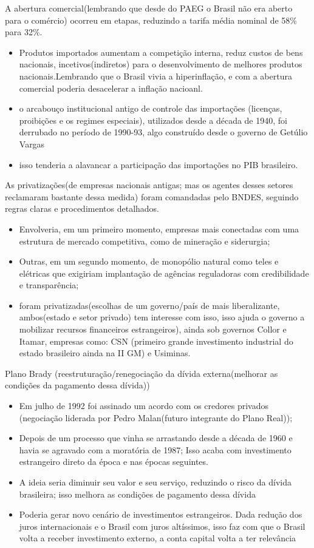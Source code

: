 \documentclass[a4paper,12pt]{article}[abntex2]
\begin{document}
A abertura comercial(lembrando que desde do PAEG o Brasil não era aberto para o comércio) ocorreu em etapas, reduzindo a tarifa média nominal de 58\% para 32\%.\begin{itemize}
    \item Produtos importados aumentam a competição interna, reduz custos de bens nacionais, incetivos(indiretos) para o desenvolvimento de melhores produtos nacionais.Lembrando que o Brasil vivia a hiperinflação, e com a abertura comercial poderia desacelerar a inflação nacioanl. 
    \item o arcabouço institucional antigo de controle das importações (licenças, proibições e os regimes especiais), utilizados desde a década de 1940, foi derrubado no período de 1990-93, algo construído desde o governo de Getúlio Vargas
    \item isso tenderia a alavancar a participação das importações no PIB brasileiro.
\end{itemize}

As privatizações(de empresas nacionais antigas; mas os agentes desses setores reclamaram bastante dessa medida) foram comandadas pelo BNDES, seguindo regras claras e procedimentos detalhados. \begin{itemize}
    \item Envolveria, em um primeiro momento, empresas mais conectadas com uma estrutura de mercado competitiva, como de mineração e siderurgia;
    \item Outras, em um segundo momento, de monopólio natural como teles e elétricas que exigiriam implantação de agências reguladoras com credibilidade e transparência;
    \item foram privatizadas(escolhas de um governo/país de mais liberalizante, ambos(estado e setor privado) tem interesse com isso, isso ajuda o governo a mobilizar recursos financeiros estrangeiros), ainda sob governos Collor e Itamar, empresas como: CSN (primeiro grande investimento industrial do estado brasileiro ainda na II GM) e Usiminas.
\end{itemize}

Plano Brady (reestruturação/renegociação da dívida externa(melhorar as condições da pagamento dessa dívida))\begin{itemize}
    \item Em julho de 1992 foi assinado um acordo com os credores privados (negociação liderada por Pedro Malan(futuro integrante do Plano Real));
    \item Depois de um processo que vinha se arrastando desde a década de 1960 e havia se agravado com a moratória de 1987; Isso acaba com investimento estrangeiro direto da época e nas épocas seguintes. 
    \item A  ideia seria diminuir seu valor e seu serviço, reduzindo o risco da dívida brasileira; isso melhora as condições de pagamento dessa dívida
    \item Poderia gerar novo cenário de investimentos estrangeiros. Dada redução dos juros internacionais e o Brasil com juros altíssimos, isso faz com que o Brasil volta a receber investimento externo, a conta capital volta a ter relevância
\end{itemize}
\end{document}
